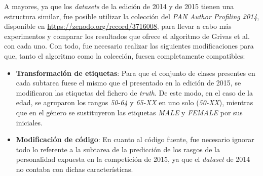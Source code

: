 \bigskip
\begin{table}[H]
	\centering
	\caption{Resultados de las pruebas realizadas con el algoritmo de Grivas et al. \cite{grivas2015author}}
	\label{tab:pruebas_grivas}
\end{table}

\bigskip
A mayores, ya que los \textit{datasets} de la edición de 2014 y de 2015 tienen una estructura similar, fue posible utilizar la colección
del \textit{PAN Author Profiling 2014}, disponible en \url{https://zenodo.org/record/3716008}, para llevar a cabo más experimentos y comparar los resultados que ofrece el algoritmo
de Grivas et al. \cite{grivas2015author} con cada uno. Con todo, fue necesario realizar las siguientes modificaciones para que, tanto el algoritmo
como la colección, fuesen completamente compatibles:

\begin{itemize}
	\item \textbf{Transformación de etiquetas}: Para que el conjunto de clases presentes en cada subtarea fuese el mismo que el presentado en la edición de 2015, se modificaron
	      las etiquetas del fichero de \textit{truth}. De este modo, en el caso de la edad, se agruparon los rangos \textit{50-64} y \textit{65-XX} en uno solo (\textit{50-XX}), mientras que en el género se sustituyeron
	      las etiquetas \textit{MALE} y \textit{FEMALE} por sus iniciales.
	\item \textbf{Modificación de código}: En cuanto al código fuente, fue necesario ignorar todo lo referente a la subtarea de la predicción de los rasgos de la personalidad
	      expuesta en la competición de 2015, ya que el \textit{dataset} de 2014 no contaba con dichas características.
\end{itemize}

